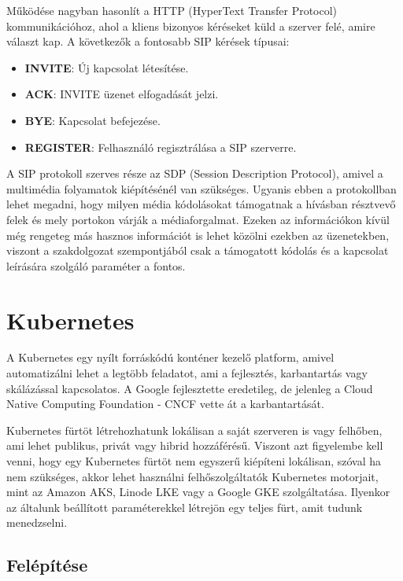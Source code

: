 Működése nagyban hasonlít a HTTP (HyperText Transfer Protocol) kommunikációhoz, ahol 
a kliens bizonyos kéréseket küld a szerver felé, amire választ kap. A következők a 
fontosabb SIP kérések típusai: 

\begin{itemize}
	\item \textbf{INVITE}: Új kapcsolat létesítése.
	\item \textbf{ACK}: INVITE üzenet elfogadását jelzi. 
	\item \textbf{BYE}: Kapcsolat befejezése. 
	\item \textbf{REGISTER}: Felhasználó regisztrálása a SIP szerverre. 
\end{itemize}

A SIP protokoll szerves része az SDP (Session Description Protocol), amivel a multimédia
folyamatok kiépítésénél van szükséges. Ugyanis ebben a protokollban lehet megadni,
hogy milyen média kódolásokat támogatnak a hívásban résztvevő felek és mely
portokon várják a médiaforgalmat. Ezeken az információkon kívül még rengeteg 
más hasznos információt is lehet közölni ezekben az üzenetekben, viszont a 
szakdolgozat szempontjából csak a támogatott kódolás és a kapcsolat leírására
szolgáló paraméter a fontos.

\section{Kubernetes}

A Kubernetes egy nyílt forráskódú konténer kezelő platform, amivel automatizálni
lehet a legtöbb feladatot, ami a fejlesztés, karbantartás vagy skálázással 
kapcsolatos. A Google fejlesztette eredetileg, de jelenleg a Cloud Native
Computing Foundation - CNCF vette át a karbantartását. 

Kubernetes fürtöt létrehozhatunk lokálisan a saját szerveren is vagy felhőben,
ami lehet publikus, privát vagy hibrid hozzáférésű. Viszont azt figyelembe 
kell venni, hogy egy Kubernetes fürtöt nem egyszerű kiépíteni lokálisan, 
szóval ha nem szükséges, akkor lehet használni felhőszolgáltatók Kubernetes 
motorjait, mint az Amazon AKS, Linode LKE vagy a Google GKE szolgáltatása.
Ilyenkor az általunk beállított paraméterekkel létrejön egy teljes fürt, amit
tudunk menedzselni. 

\subsection{Felépítése}

